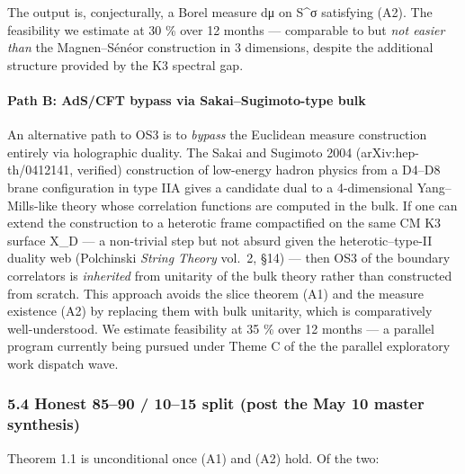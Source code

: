 \documentclass[
 11pt,
 a4paper,
]{article}
\begin{document}
The output is, conjecturally, a Borel measure dμ on S\^{}σ satisfying (A2). The feasibility we estimate at 30 \% over 12 months --- comparable to but \emph{not easier than} the Magnen--Sénéor construction in 3 dimensions, despite the additional structure provided by the K3 spectral gap.

\hypertarget{path-b-adscft-bypass-via-sakaisugimoto-type-bulk}{%
\paragraph{Path B: AdS/CFT bypass via Sakai--Sugimoto-type bulk}\label{path-b-adscft-bypass-via-sakaisugimoto-type-bulk}}

An alternative path to OS3 is to \emph{bypass} the Euclidean measure construction entirely via holographic duality. The Sakai and Sugimoto 2004 (arXiv:hep-th/0412141, verified) construction of low-energy hadron physics from a D4--D8 brane configuration in type IIA gives a candidate dual to a 4-dimensional Yang--Mills-like theory whose correlation functions are computed in the bulk. If one can extend the construction to a heterotic frame compactified on the same CM K3 surface X\_D --- a non-trivial step but not absurd given the heterotic--type-II duality web (Polchinski \emph{String Theory} vol.~2, §14) --- then OS3 of the boundary correlators is \emph{inherited} from unitarity of the bulk theory rather than constructed from scratch. This approach avoids the slice theorem (A1) and the measure existence (A2) by replacing them with bulk unitarity, which is comparatively well-understood. We estimate feasibility at 35 \% over 12 months --- a parallel program currently being pursued under Theme C of the the parallel exploratory work dispatch wave.

\hypertarget{honest-8590-1015-split-post-the May 10 master synthesis}{%
\subsubsection{5.4 Honest 85--90 / 10--15 split (post the May 10 master synthesis)}\label{honest-8590-1015-split-post-the May 10 master synthesis}}

Theorem 1.1 is unconditional once (A1) and (A2) hold. Of the two:
\end{document}
